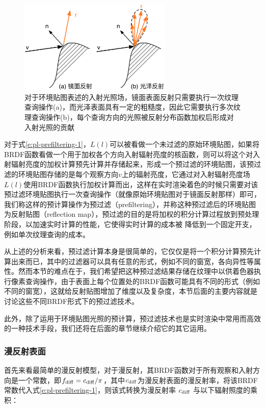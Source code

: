\begin{figure}
	\sidecaption
	\includegraphics[width=0.65\textwidth]{figures/pl/pl-pre-filtering-1}
	\caption{对于环境贴图表述的入射光照场，镜面表面反射只需要执行一次纹理查询操作(a)，而光泽表面具有一定的粗糙度，因此它需要执行多次纹理查询操作(b)，每个查询方向的光照被反射分布函数加权后形成对入射光照的贡献}
	\label{f:pl-pl-pre-filtering-1}
\end{figure}

对于式\ref{e:pl-prefiltering-1}，$L(l)$可以被看做一个未过滤的原始环境贴图，如果将BRDF函数看做一个用于加权各个方向入射辐射亮度的核函数，则可以将这个对入射辐射亮度的加权计算预先计算并存储起来，形成一个预过滤的环境贴图，该预过滤的环境贴图存储的是每个观察方向$v$上的辐射亮度，它通过对入射辐射亮度场$L(l)$使用BRDF函数执行加权计算而出，这样在实时渲染着色的时候只需要对该预过滤环境贴图执行一次查询操作（就像原始环境贴图对于镜面反射那样）即可，我们称这样的预计算操作为预过滤（prefiltering），并称这种预过滤后的环境贴图为反射贴图（reflection map），预过滤的目的是将加权的积分计算过程放到预处理阶段，以加速实时计算的性能，它使得实时计算的成本被 降低到一个固定开支，例如单次纹理查询的成本。

从上述的分析来看，预过滤计算本身是很简单的，它仅仅是将一个积分计算预先计算出来而已，其中的过滤器可以具有任意的形式，例如不同的窗宽，各向异性等属性。然而本节的难点在于，我们希望把这种预过滤结果存储在纹理中以供着色器执行像素查询操作，由于表面上每个位置处的BRDF函数可能具有不同的形式（例如不同的窗宽），这就给反射贴图增加了维度以及复杂度，本节后面的主要内容就是讨论这些不同BRDF形式下的预过滤技术。

此外，除了运用于环境贴图光照的预计算，预过滤技术也是实时渲染中常用而高效的一种技术手段，我们还将在后面的章节继续介绍它的其它运用。




\subsubsection{漫反射表面}
首先来看最简单的漫反射模型，对于漫反射，其BRDF函数对于所有观察和入射方向是一个常数，即$f_{\rm diff} = c_{\rm diff}/\pi$，其中$c_{\rm diff}$为漫反射表面的漫反射率，将该BRDF常数代入式\ref{e:pl-prefiltering-1}，则该式转换为漫反射率 $c_{\rm diff}$ 与以下辐射照度的乘积：

